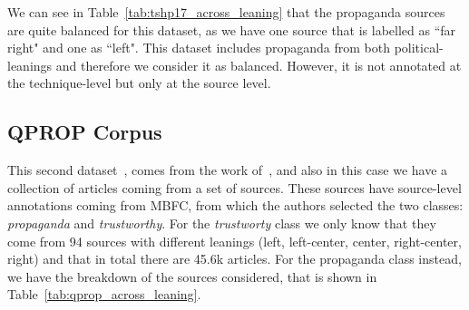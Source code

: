 

We can see in Table~\ref{tab:tshp17_across_leaning} that the propaganda sources are quite balanced for this dataset, as we have one source that is labelled as ``far right" and one as ``left".
This dataset includes propaganda from both political-leanings and therefore we consider it as balanced. However, it is not annotated at the technique-level but only at the source level.


\subsection{QPROP Corpus}

This second dataset~\citep{alberto_barron_cedeno_2019_3271522}, comes from the work of~\citet{barron2019proppy}, and also in this case we have a collection of articles coming from a set of sources. These sources have source-level annotations coming from MBFC, from which the authors selected the two classes: \emph{propaganda} and \emph{trustworthy}.
For the \textit{trustworty} class we only know that they come from 94 sources with different leanings (left, left-center, center, right-center, right) and that in total there are 45.6k articles.
For the propaganda class instead, we have the breakdown of the sources considered, that is shown in Table~\ref{tab:qprop_across_leaning}.


